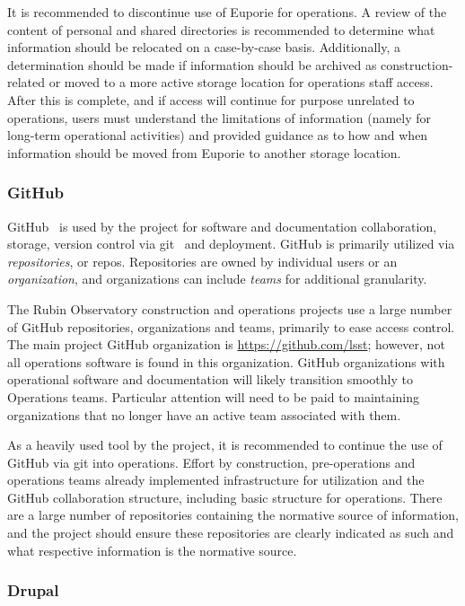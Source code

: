 It is recommended to discontinue use of Euporie for operations.
A review of the content of personal and shared directories is recommended to determine what information should be relocated on a case-by-case basis.
Additionally, a determination should be made if information should be archived as construction-related or moved to a more active storage location for operations staff access.
After this is complete, and if access will continue for purpose unrelated to operations, users must understand the limitations of information (namely for long-term operational activities) and provided guidance as to how and when information should be moved from Euporie to another storage location.

\subsubsection{GitHub}

GitHub\texttrademark\ \citep{GitHub-cite} is used by the project for software and documentation collaboration, storage, version control via git\texttrademark\ \citep{git-cite} and deployment.
GitHub is primarily utilized via \emph{repositories}, or repos.
Repositories are owned by individual users or an \emph{organization}, and organizations can include \emph{teams} for additional granularity.

The Rubin Observatory construction and operations projects use a large number of GitHub repositories, organizations and teams, primarily to ease access control.
The main project GitHub organization is \url{https://github.com/lsst}; however, not all operations software is found in this organization.
GitHub organizations with operational software and documentation will likely transition smoothly to Operations teams.
Particular attention will need to be paid to maintaining organizations that no longer have an active team associated with them.

As a heavily used tool by the project, it is recommended to continue the use of GitHub via git into operations.
Effort by construction, pre-operations and operations teams already implemented infrastructure for utilization and the GitHub collaboration structure, including basic structure for operations.
There are a large number of repositories containing the normative source of information, and the project should ensure these repositories are clearly indicated as such and what respective information is the normative source.

\subsubsection{Drupal}

